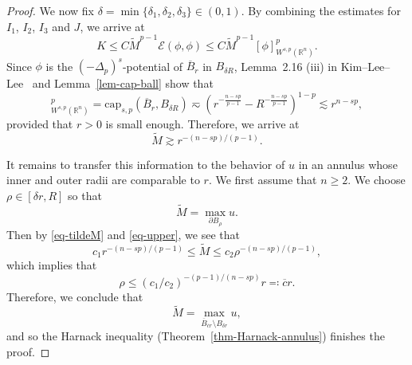 \documentclass[11pt]{amsart}
\theoremstyle{plain}
\theoremstyle{definition}
\numberwithin{equation}{section}
\begin{document}
\begin{proof}
We now fix $\delta=\min\{\delta_1, \delta_2, \delta_3\} \in (0,1)$. By combining the estimates for $I_1$, $I_2$, $I_3$ and $J$, we arrive at
\begin{equation*}
K \leq C\widetilde{M}^{p-1} \mathcal{E}(\phi, \phi) \leq C\widetilde{M}^{p-1} [\phi]_{W^{s, p}(\mathbb{R}^n)}^p.
\end{equation*}
Since $\phi$ is the $(-\Delta_p)^s$-potential of $\overline{B}_r$ in $B_{\delta R}$, Lemma~2.16 (iii) in Kim--Lee--Lee~\cite{KLL23} and Lemma~\ref{lem-cap-ball} show that
\begin{equation*}
[\phi]_{W^{s, p}(\mathbb{R}^n)}^p = \mathrm{cap}_{s, p}(\overline{B}_r, B_{\delta R}) \eqsim \left(r^{-\frac{n-sp}{p-1}}-R^{-\frac{n-sp}{p-1}} \right)^{1-p} \lesssim r^{n-sp},
\end{equation*}
provided that $r>0$ is small enough. Therefore, we arrive at
\begin{equation}\label{eq-tildeM}
	\widetilde{M} \gtrsim r^{-(n-sp)/(p-1)}.
\end{equation}

It remains to transfer this information to the behavior of $u$ in an annulus whose inner and outer radii are comparable to $r$. We first assume that $n \geq 2$. We choose $\rho \in [\delta r, R]$ so that
\begin{equation*}
	\widetilde{M}=\max_{\partial B_{\rho}}u.
\end{equation*}
Then by \eqref{eq-tildeM} and \eqref{eq-upper}, we see that
\begin{equation*}
	c_1 r^{-(n-sp)/(p-1)} \leq \widetilde{M} \leq c_2 \rho^{-(n-sp)/(p-1)},
\end{equation*}
which implies that
\begin{equation*}
	\rho \leq (c_1/c_2)^{-(p-1)/(n-sp)} r\eqqcolon \overline{c}r.
\end{equation*}
Therefore, we conclude that
\begin{equation*}
	\widetilde{M}=\max_{\overline{B}_{\overline{c}r} \setminus B_{\delta r}}u,
\end{equation*}
and so the Harnack inequality (Theorem~\ref{thm-Harnack-annulus}) finishes the proof.


\end{proof}
\end{document}
